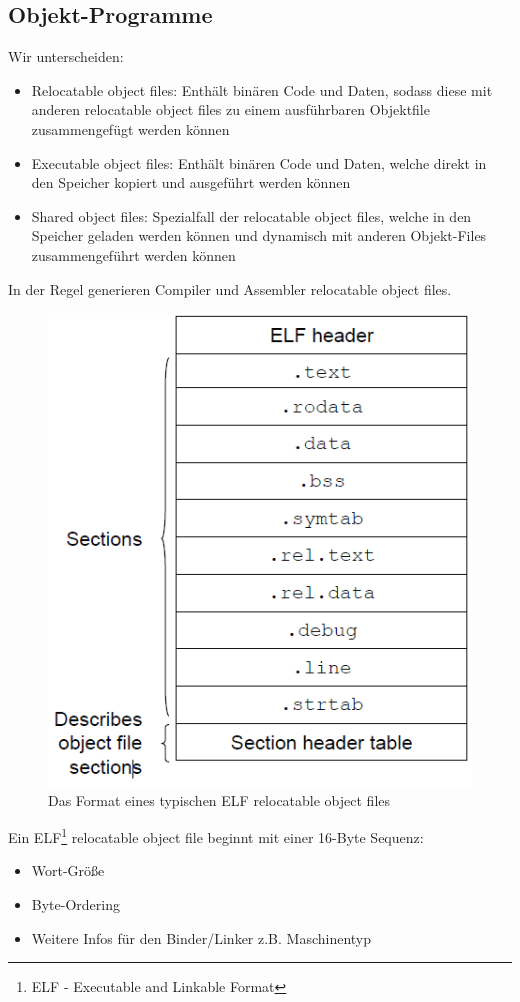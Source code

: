\documentclass[a4paper,12pt,leqno]{article}
\begin{document}
\subsection{Objekt-Programme}
Wir unterscheiden:
\begin{itemize}
\item Relocatable object files: Enthält binären Code und Daten, sodass diese mit anderen relocatable object files zu einem ausführbaren Objektfile zusammengefügt werden können
\item Executable object files: Enthält binären Code und Daten, welche direkt in den Speicher kopiert und ausgeführt werden können
\item Shared object files: Spezialfall der relocatable object files, welche in den Speicher geladen werden können und dynamisch mit anderen Objekt-Files zusammengeführt werden können 
\end{itemize}
In der Regel generieren Compiler und Assembler relocatable object files.

\begin{figure}[h!]
\centering
\includegraphics[scale=0.6]{Grafiken/relocatableObjectFile.png}
\caption{Das Format eines typischen ELF relocatable object files}
\end{figure}
Ein ELF\footnote{ELF - Executable and Linkable Format} relocatable object file beginnt mit einer 16-Byte Sequenz:
\begin{itemize}
\item Wort-Größe
\item Byte-Ordering
\item Weitere Infos für den Binder/Linker z.B. Maschinentyp
\end{itemize} 
\end{document}
